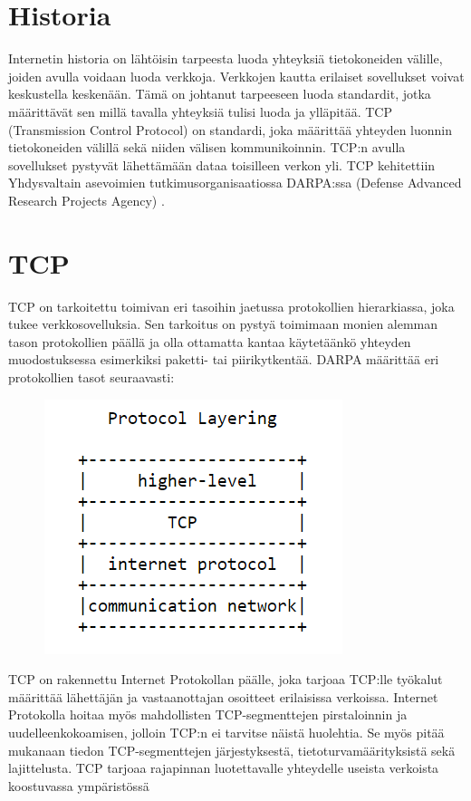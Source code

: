 \documentclass[utf8]{gradu3}
\begin{document}
\section{Historia}
Internetin historia on lähtöisin tarpeesta luoda yhteyksiä tietokoneiden välille, joiden avulla voidaan luoda verkkoja. Verkkojen kautta erilaiset sovellukset voivat keskustella keskenään. Tämä on johtanut tarpeeseen luoda standardit, jotka määrittävät sen millä tavalla yhteyksiä tulisi luoda ja ylläpitää. TCP (Transmission Control Protocol) on standardi, joka määrittää yhteyden luonnin tietokoneiden välillä sekä niiden välisen kommunikoinnin. TCP:n avulla sovellukset pystyvät lähettämään dataa toisilleen verkon yli. TCP kehitettiin Yhdysvaltain asevoimien tutkimusorganisaatiossa DARPA:ssa (Defense Advanced Research Projects Agency) \parencite{tcp1_1}. 

\section{TCP}
TCP on tarkoitettu toimivan eri tasoihin jaetussa protokollien hierarkiassa, joka tukee verkkosovelluksia. Sen tarkoitus on pystyä toimimaan monien alemman tason protokollien päällä ja olla ottamatta kantaa käytetäänkö yhteyden muodostuksessa esimerkiksi paketti- tai piirikytkentää. DARPA määrittää eri protokollien tasot seuraavasti:


\begin{figure}[h]
\centering
\includegraphics[scale=0.85]{protocol_layering.PNG}
\caption{\parencite{tcp1_1}}
\end{figure}


TCP on rakennettu Internet Protokollan päälle, joka tarjoaa TCP:lle työkalut määrittää lähettäjän ja vastaanottajan osoitteet erilaisissa verkoissa. Internet Protokolla hoitaa myös mahdollisten TCP-segmenttejen pirstaloinnin ja uudelleenkokoamisen, jolloin TCP:n ei tarvitse näistä huolehtia. Se myös pitää mukanaan tiedon TCP-segmenttejen järjestyksestä, tietoturvamäärityksistä sekä lajittelusta. TCP tarjoaa rajapinnan luotettavalle yhteydelle useista verkoista koostuvassa ympäristössä \parencite{tcp1_1} 
\end{document}
